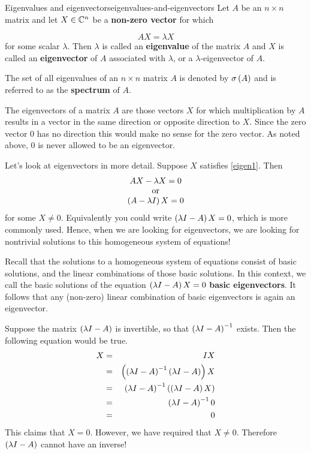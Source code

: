 \begin{definition}{Eigenvalues and eigenvectors}{eigenvalues-and-eigenvectors}
Let $A$ be an $n\times n$ matrix and let $X \in \mathbb{C}^{n}$ be a
\textbf{non-zero vector} for which

\begin{equation}
AX=\lambda X  \label{eigen1}
\end{equation}
for some scalar $\lambda .$ Then $\lambda $ is called an
\textbf{eigenvalue}
of the matrix $A$ and $X$ is called an \textbf{eigenvector} of $A$ associated with $\lambda$, or a $\lambda$-eigenvector of $A$. 
 
The set of all eigenvalues of an $n\times n$ matrix $A$ is denoted by 
$\sigma \left(A\right) $ and is referred to as the \textbf{spectrum} of $A.$
\end{definition}

The eigenvectors of a matrix $A$ are those vectors $X$ for which
multiplication by $A$ results in a vector in the same direction or opposite
direction to $X$. Since the zero vector $0$ has no
direction this would make no sense for the zero vector. As noted above, 
$0$ is never allowed to be an eigenvector. 

Let's look at eigenvectors in more detail. Suppose $X$ satisfies \ref{eigen1}. Then
\begin{equation*}
\begin{array}{c}
AX - \lambda X = 0 \\
\mbox{or} \\
\left(A-\lambda I\right) X = 0
\end{array}
\end{equation*}
for some $X \neq 0.$ Equivalently you could write $\left(\lambda
I-A\right)X = 0$, which is more commonly used.  Hence, when we are looking for eigenvectors, we are
looking for nontrivial solutions to this homogeneous system of equations!

Recall that the solutions to a homogeneous system of equations consist
of basic solutions, and the linear combinations of those basic
solutions. In this context, we call the basic solutions of the
equation $\left(\lambda I - A\right) X = 0$ \textbf{basic
eigenvectors}. It follows that any (non-zero) linear combination of basic
eigenvectors is again an eigenvector.

Suppose the matrix $\left(\lambda I - A\right)$ is invertible, so that
$\left(\lambda I - A\right)^{-1}$ exists.
Then the following equation would be true.
\begin{eqnarray*}
X &=& IX \\
&=& \left(\left(\lambda I - A\right) ^{-1}\left(\lambda I - A \right)
\right) X \\
&=&\left(\lambda I - A\right) ^{-1}\left(\left(\lambda
I - A\right) X\right) \\
&=& \left(\lambda I - A\right) ^{-1}0 \\
&=& 0
\end{eqnarray*}
This claims that $X=0$. However, we have required that $ X \neq 0$. Therefore  $\left(\lambda I - A\right)$
cannot have an inverse! 

